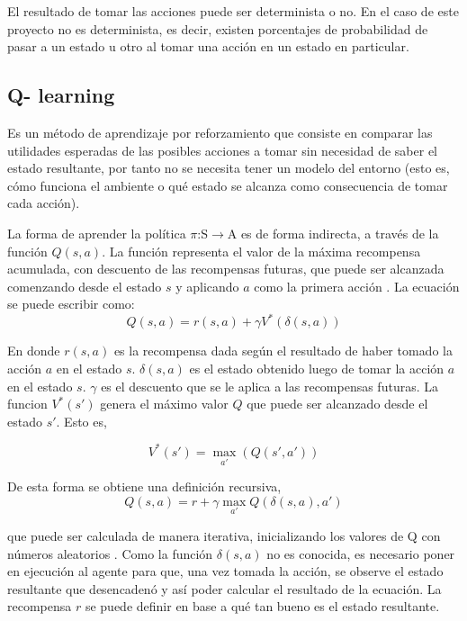 El resultado de tomar las acciones puede ser determinista o no. En el caso de este proyecto no es determinista, es decir, existen porcentajes de probabilidad de pasar a un estado u otro al tomar una acción en un estado en particular.
  
\subsection{Q- learning}\label{subsec:Qlearning}

Es un método de aprendizaje por reforzamiento que consiste en comparar las utilidades esperadas de las posibles acciones a tomar sin necesidad de saber el estado resultante, por tanto no se necesita tener un modelo del entorno \cite{peterNorvig} (esto es, cómo funciona el ambiente o qu\'e estado se alcanza como consecuencia de tomar cada acción).

La forma de aprender la política $\pi$:S$\to$A es de forma indirecta, a través de la función $Q(s,a)$. La función representa el valor de la máxima recompensa acumulada, con descuento de las recompensas futuras, que puede ser alcanzada comenzando desde el estado $s$ y aplicando $a$ como la primera acción \cite{Mitchell}. La ecuación se puede escribir como:
\begin{equation}
Q(s,a) = r(s,a) + {\gamma V^*(\delta(s,a))}
\end{equation}


En donde $r(s,a)$ es la recompensa dada según el resultado de haber tomado la acción $a$ en el estado $s$. $\delta(s,a)$ es el estado obtenido luego de tomar la acción $a$ en el estado $s$. $\gamma$ es el descuento que se le aplica a las recompensas futuras. La funcion $V^*(s')$ genera el máximo valor $Q$ que puede ser alcanzado desde el estado $s'$. Esto es,

\begin{equation}
V^*(s') = \max_{a'} (Q(s',a'))
\end{equation}



De esta forma se obtiene una definición recursiva,
\begin{equation}
Q(s,a) = r + \gamma \max_{a'} Q(\delta(s,a) , a')  
\end{equation}

\noindent
que puede ser calculada de manera iterativa, inicializando los valores de Q con números aleatorios \cite{Mitchell}. Como la función $\delta(s,a)$ no es conocida, es necesario poner en ejecución al agente para que, una vez tomada la acción, se observe el estado resultante que desencadenó y así poder calcular el resultado de la ecuación. La recompensa $r$ se puede definir en base  a qu\'e tan bueno es el estado resultante. 



